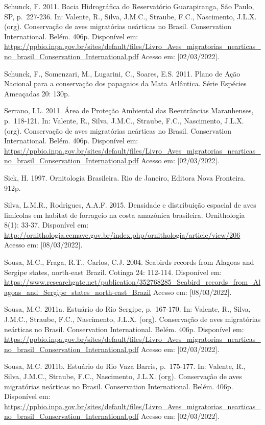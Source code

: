 \documentclass[
  oneside]{scrbook}
\begin{document}
Schunck, F. 2011. Bacia Hidrográfica do Reservatório Guarapiranga, São Paulo, SP, p.~227-236. In: Valente, R., Silva, J.M.C., Straube, F.C., Nascimento, J.L.X. (org). Conservação de aves migratórias neárticas no Brasil. Conservation International. Belém. 406p. Disponível em: \url{https://ppbio.inpa.gov.br/sites/default/files/Livro_Aves_migratorias_nearticas_no_brasil_Conservation_International.pdf} Acesso em: {[}02/03/2022{]}.

Schunck, F., Somenzari, M., Lugarini, C., Soares, E.S. 2011. Plano de Ação Nacional para a conservação dos papagaios da Mata Atlântica. Série Espécies Ameaçadas 20: 130p.

Serrano, I.L. 2011. Área de Proteção Ambiental das Reentrâncias Maranhenses, p.~118-121. In: Valente, R., Silva, J.M.C., Straube, F.C., Nascimento, J.L.X. (org). Conservação de aves migratórias neárticas no Brasil. Conservation International. Belém. 406p. Disponível em: \url{https://ppbio.inpa.gov.br/sites/default/files/Livro_Aves_migratorias_nearticas_no_brasil_Conservation_International.pdf} Acesso em: {[}02/03/2022{]}.

Sick, H. 1997. Ornitologia Brasileira. Rio de Janeiro, Editora Nova Fronteira. 912p.

Silva, L.M.R., Rodrigues, A.A.F. 2015. Densidade e distribuição espacial de aves limícolas em habitat de forrageio na costa amazônica brasileira. Ornithologia 8(1): 33-37. Disponível em: \url{http://ornithologia.cemave.gov.br/index.php/ornithologia/article/view/206} Acesso em: {[}08/03/2022{]}.

Sousa, M.C., Fraga, R.T., Carlos, C.J. 2004. Seabirds records from Alagoas and Sergipe states, north-east Brazil. Cotinga 24: 112-114. Disponível em: \url{https://www.researchgate.net/publication/352768285_Seabird_records_from_Alagoas_and_Sergipe_states_north-east_Brazil} Acesso em: {[}08/03/2022{]}.

Sousa, M.C. 2011a. Estuário do Rio Sergipe, p.~167-170. In: Valente, R., Silva, J.M.C., Straube, F.C., Nascimento, J.L.X. (org). Conservação de aves migratórias neárticas no Brasil. Conservation International. Belém. 406p. Disponível em: \url{https://ppbio.inpa.gov.br/sites/default/files/Livro_Aves_migratorias_nearticas_no_brasil_Conservation_International.pdf} Acesso em: {[}02/03/2022{]}.

Sousa, M.C. 2011b. Estuário do Rio Vaza Barris, p.~175-177. In: Valente, R., Silva, J.M.C., Straube, F.C., Nascimento, J.L.X. (org). Conservação de aves migratórias neárticas no Brasil. Conservation International. Belém. 406p. Disponível em: \url{https://ppbio.inpa.gov.br/sites/default/files/Livro_Aves_migratorias_nearticas_no_brasil_Conservation_International.pdf} Acesso em: {[}02/03/2022{]}.
\end{document}
